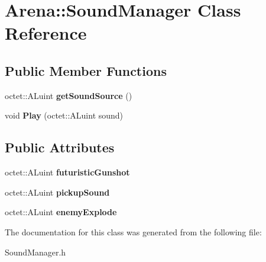\hypertarget{class_arena_1_1_sound_manager}{\section{Arena\+:\+:Sound\+Manager Class Reference}
\label{class_arena_1_1_sound_manager}
}
\subsection*{Public Member Functions}
\begin{DoxyCompactItemize}
\item 
\hypertarget{class_arena_1_1_sound_manager_a45681e77cb2d5edb5c9eacc2800e93ea}{octet\+::\+A\+Luint {\bfseries get\+Sound\+Source} ()}\label{class_arena_1_1_sound_manager_a45681e77cb2d5edb5c9eacc2800e93ea}

\item 
\hypertarget{class_arena_1_1_sound_manager_aa0aa24c2baab8b329182c216c5a99a34}{void {\bfseries Play} (octet\+::\+A\+Luint sound)}\label{class_arena_1_1_sound_manager_aa0aa24c2baab8b329182c216c5a99a34}

\end{DoxyCompactItemize}
\subsection*{Public Attributes}
\begin{DoxyCompactItemize}
\item 
\hypertarget{class_arena_1_1_sound_manager_a0baa97c709286b261b55b06287179dd9}{octet\+::\+A\+Luint {\bfseries futuristic\+Gunshot}}\label{class_arena_1_1_sound_manager_a0baa97c709286b261b55b06287179dd9}

\item 
\hypertarget{class_arena_1_1_sound_manager_a8892fb7b5cd0851e2cbe2615ff1f97be}{octet\+::\+A\+Luint {\bfseries pickup\+Sound}}\label{class_arena_1_1_sound_manager_a8892fb7b5cd0851e2cbe2615ff1f97be}

\item 
\hypertarget{class_arena_1_1_sound_manager_a1bb4bf9c411e5b6a14538d0916ae0611}{octet\+::\+A\+Luint {\bfseries enemy\+Explode}}\label{class_arena_1_1_sound_manager_a1bb4bf9c411e5b6a14538d0916ae0611}

\end{DoxyCompactItemize}


The documentation for this class was generated from the following file\+:\begin{DoxyCompactItemize}
\item 
Sound\+Manager.\+h\end{DoxyCompactItemize}
